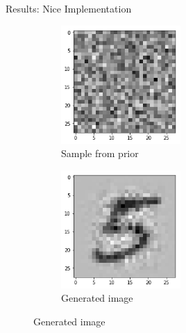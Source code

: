 \begin{frame}{Results: Nice Implementation}
\begin{figure}[htbp!]
     \hfill
\end{figure}
    \begin{figure}[htbp!]
     \centering
     \begin{subfigure}[b]{0.45\textwidth}
         \centering
         \includegraphics[width=0.5\textwidth]{Images/sample.png}
         \caption{Sample from prior}
     \end{subfigure} 
     \hfill
     \begin{subfigure}[b]{0.45\textwidth}
         \centering
         \includegraphics[width=0.5\textwidth]{Images/generated.png}
         \caption{Generated image}
     \end{subfigure}
     \hfill
\end{figure}
\end{frame}

